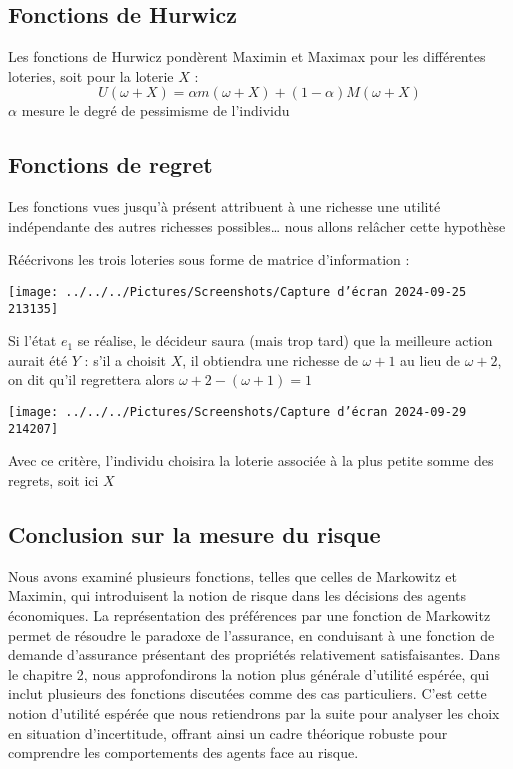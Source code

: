 \documentclass[a4paper, 12pt]{report}
\begin{document}
\subsection{Fonctions de Hurwicz}

Les fonctions de Hurwicz pondèrent Maximin et Maximax pour les différentes loteries, soit pour la loterie $X$ :
$$
U(\omega +X)= \alpha m (\omega +X)+(1-\alpha)M(\omega +X)
$$
$\alpha$ mesure le degré de pessimisme de l'individu

\subsection{Fonctions de regret }

Les fonctions vues jusqu'à présent attribuent à une richesse une utilité indépendante des autres richesses possibles… nous allons relâcher cette hypothèse

Réécrivons les trois loteries sous forme de matrice d'information :
\begin{center}
	\texttt{[image: ../../../Pictures/Screenshots/Capture d'écran 2024-09-25 213135]}
\end{center}
Si l'état $e_1$ se réalise, le décideur saura (mais trop tard) que la meilleure action aurait été $Y$ : s'il a choisit $X$, il obtiendra une richesse de $\omega + 1$ au lieu de $\omega + 2$,  on dit qu'il regrettera alors $\omega+2-(\omega+1)=1$
\begin{center}
\texttt{[image: ../../../Pictures/Screenshots/Capture d'écran 2024-09-29 214207]}
\end{center}
Avec ce critère, l'individu choisira la loterie associée à la plus petite somme des regrets, soit ici $X$

\subsection{Conclusion sur la mesure du risque}

Nous avons examiné plusieurs fonctions, telles que celles de Markowitz et Maximin, qui introduisent la notion de risque dans les décisions des agents économiques. La représentation des préférences par une fonction de Markowitz permet de résoudre le paradoxe de l'assurance, en conduisant à une fonction de demande d'assurance présentant des propriétés relativement satisfaisantes. Dans le chapitre 2, nous approfondirons la notion plus générale d'utilité espérée, qui inclut plusieurs des fonctions discutées comme des cas particuliers. C'est cette notion d'utilité espérée que nous retiendrons par la suite pour analyser les choix en situation d'incertitude, offrant ainsi un cadre théorique robuste pour comprendre les comportements des agents face au risque.
\end{document}
